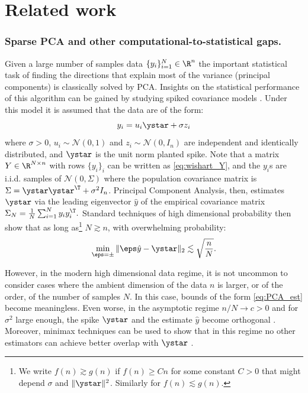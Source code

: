 \section{Related work}

\subsubsection*{Sparse PCA and other computational-to-statistical  gaps.}

Given a large number of samples data  $\{y_i\}^{N}_{i=1} \in \R^n$
the important statistical task of finding 
the directions that explain most of the variance (principal components)
is classically solved by PCA.  Insights on the statistical performance of this algorithm 
can be gained by studying spiked covariance models \citep{johnstone2001distribution}.
Under this model it is assumed that the data are of the form: 
\begin{equation}\label{eq:spiked_samples}
y_{i} = u_{i} \ystar + \sigma z_{i}
\end{equation}
where $\sigma > 0$,  $u_i \sim \mathcal{N}(0,1)$ and $z_{i} \sim \mathcal{N}(0, I_n)$ 
are independent and identically distributed, and $\ystar$ is the unit norm planted spike. Note that a matrix $Y \in \R^{N \times n}$ with rows $\{y_{i}\}_i$ can be written as \eqref{eq:wishart_Y}, and the $y_{i}$s are i.i.d. samples of $\mathcal{N}(0, \Sigma)$ 
where the population covariance matrix is $\Sigma = \ystar \ystar^\T + \sigma^2 I_n$.
Principal Component Analysis, then, estimates $\ystar$ via the leading eigenvector $\hat{y}$ 
of the empirical covariance matrix
$\Sigma_{N} = \frac{1}{N}\sum_{i=1}^N y_{i} y_{i}^\T.$
Standard techniques of high dimensional probability then show that as long as\footnote{We write $f(n) \gtrsim g(n)$ if $f(n) \geq C n$ for 
	some constant $C > 0$ that might depend $\sigma$ and $\|\ystar\|^2$. Similarly for $f(n) \lesssim g(n)$.} $N \gtrsim n$, with overwhelming probability:
\begin{equation}\label{eq:PCA_est}
\min_{\eps = \pm} \| \eps \hat{y} - \ystar \|_2 \lesssim \sqrt{\frac{n}{N}}.
\end{equation}

However, in the modern high dimensional data regime, it is not uncommon
to consider cases where the ambient dimension of the data $n$ 
is larger, or of the order, of the number of samples $N$. In this case,
bounds of the form \eqref{eq:PCA_est} become meaningless. Even worse,
in the asymptotic regime $ n/N \to c > 0$ and for $\sigma^2$ large enough, the spike $\ystar$ and the estimate $\hat{y}$ become orthogonal \citep{johnstone2009}. Moreover, minimax techniques 
can be used to show that in this regime	 no other estimators can achieve better overlap with $\ystar$ \citep{wainwright2019high}.

